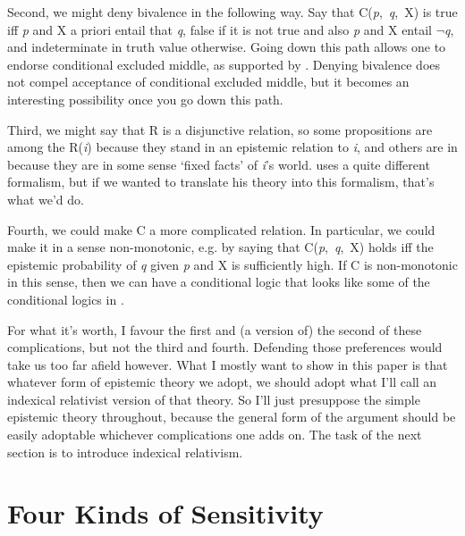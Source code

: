 Second, we might deny bivalence in the following way. Say that C(\textit{p},~\textit{q},~X) is true iff \textit{p} and X a priori entail that \textit{q}, false if it is not true and also \textit{p} and X entail \(\neg\){}\textit{q}, and indeterminate in truth value otherwise. Going down this path allows one to endorse conditional excluded middle, as supported by \cite{Stalnaker1981}. Denying bivalence does not compel acceptance of conditional excluded middle, but it becomes an interesting possibility once you go down this path.

Third, we might say that R is a disjunctive relation, so some propositions are among the R(\textit{i}) because they stand in an epistemic relation to \textit{i}, and others are in because they are in some sense `fixed facts' of \textit{i}'s world. \cite{Nolan2003} uses a quite different formalism, but if we wanted to translate his theory into this formalism, that's what we'd do.

Fourth, we could make C a more complicated relation. In particular, we could make it in a sense non-monotonic, e.g. by saying that C(\textit{p},~\textit{q},~X) holds iff the epistemic probability of \textit{q} given \textit{p} and X is sufficiently high. If C is non-monotonic in this sense, then we can have a conditional logic that looks like some of the conditional logics in \cite{Lewis1973a}.

For what it's worth, I favour the first and (a version of) the second of these complications, but not the third and fourth. Defending those preferences would take us too far afield however. What I mostly want to show in this paper is that whatever form of epistemic theory we adopt, we should adopt what I'll call an indexical relativist version of that theory. So I'll just presuppose the simple epistemic theory throughout, because the general form of the argument should be easily adoptable whichever complications one adds on. The task of the next section is to introduce indexical relativism.


\section{Four Kinds of Sensitivity}

